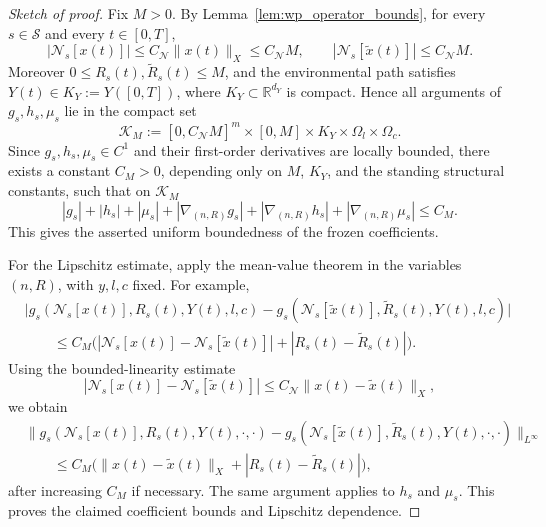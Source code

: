 \documentclass[10pt,a4paper]{amsart}
\begin{document}
\begin{proof}[Sketch of proof]
Fix \(M>0\). By Lemma~\ref{lem:wp_operator_bounds}, for every \(s\in\mathcal S\) and
every \(t\in[0,T]\),
\[
|\mathcal N_s[x(t)]|
\le C_{\mathcal N}\|x(t)\|_X
\le C_{\mathcal N}M,
\qquad
|\mathcal N_s[\widetilde x(t)]|
\le C_{\mathcal N}M .
\]
Moreover \(0\le R_s(t),\widetilde R_s(t)\le M\), and the environmental path satisfies
\(Y(t)\in K_Y:=Y([0,T])\), where \(K_Y\subset\mathbb R^{d_Y}\) is compact. Hence all
arguments of \(g_s,h_s,\mu_s\) lie in the compact set
\[
\mathcal K_M
:=
[0,C_{\mathcal N}M]^m
\times[0,M]
\times K_Y
\times\Omega_l
\times\Omega_c .
\]
Since \(g_s,h_s,\mu_s\in C^1\) and their first-order derivatives are locally bounded,
there exists a constant \(C_M>0\), depending only on \(M\), \(K_Y\), and the standing
structural constants, such that on \(\mathcal K_M\)
\[
|g_s|+|h_s|+|\mu_s|
+
|\nabla_{(n,R)}g_s|
+
|\nabla_{(n,R)}h_s|
+
|\nabla_{(n,R)}\mu_s|
\le C_M .
\]
This gives the asserted uniform boundedness of the frozen coefficients.

For the Lipschitz estimate, apply the mean-value theorem in the variables
\((n,R)\), with \(y,l,c\) fixed. For example,
\[
\begin{aligned}
&\big|
g_s(\mathcal N_s[x(t)],R_s(t),Y(t),l,c)
-
g_s(\mathcal N_s[\widetilde x(t)],\widetilde R_s(t),Y(t),l,c)
\big|
\\
&\qquad
\le
C_M
\Big(
|\mathcal N_s[x(t)]-\mathcal N_s[\widetilde x(t)]|
+
|R_s(t)-\widetilde R_s(t)|
\Big).
\end{aligned}
\]
Using the bounded-linearity estimate
\[
|\mathcal N_s[x(t)]-\mathcal N_s[\widetilde x(t)]|
\le C_{\mathcal N}\|x(t)-\widetilde x(t)\|_X,
\]
we obtain
\[
\begin{aligned}
&\big\|
g_s(\mathcal N_s[x(t)],R_s(t),Y(t),\cdot,\cdot)
-
g_s(\mathcal N_s[\widetilde x(t)],\widetilde R_s(t),Y(t),\cdot,\cdot)
\big\|_{L^\infty}
\\
&\qquad
\le
C_M
\big(
\|x(t)-\widetilde x(t)\|_X
+
|R_s(t)-\widetilde R_s(t)|
\big),
\end{aligned}
\]
after increasing \(C_M\) if necessary. The same argument applies to \(h_s\) and
\(\mu_s\). This proves the claimed coefficient bounds and Lipschitz dependence.
\end{proof}
\end{document}
